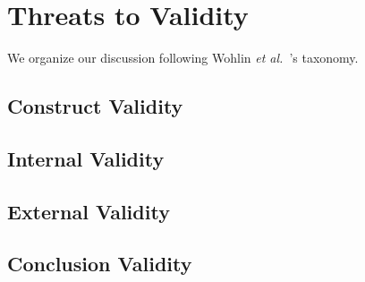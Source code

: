 \chapter{Threats to Validity}\label{chap:validity_threats}

We organize our discussion following Wohlin \textit{et al.}~\cite{Wohlin12}'s taxonomy.

\section{Construct Validity}\label{sec:construct-validity}
\lipsum[1-1]

\section{Internal Validity}\label{sec:internal-validity}
\lipsum[1-1]

\section{External Validity}\label{sec:external-validity}
\lipsum[1-1]

\section{Conclusion Validity}\label{sec:conclusion-validity}
\lipsum[1-1]
